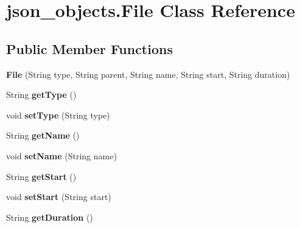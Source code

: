 \hypertarget{classjson__objects_1_1_file}{
\section{json\_\-objects.File Class Reference}
\label{classjson__objects_1_1_file}
}
\subsection*{Public Member Functions}
\begin{DoxyCompactItemize}
\item 
\hypertarget{classjson__objects_1_1_file_a3c3896088aa0d60ee4d27b61d6dbc1df}{
{\bfseries File} (String type, String parent, String name, String start, String duration)}
\label{classjson__objects_1_1_file_a3c3896088aa0d60ee4d27b61d6dbc1df}

\item 
\hypertarget{classjson__objects_1_1_file_a67dbfc9533416734c046255cf623bad7}{
String {\bfseries getType} ()}
\label{classjson__objects_1_1_file_a67dbfc9533416734c046255cf623bad7}

\item 
\hypertarget{classjson__objects_1_1_file_a7579b5773083d54cee785234b7fb85f0}{
void {\bfseries setType} (String type)}
\label{classjson__objects_1_1_file_a7579b5773083d54cee785234b7fb85f0}

\item 
\hypertarget{classjson__objects_1_1_file_a4b5a3a7c9a7f16eae3b5c43ee490e798}{
String {\bfseries getName} ()}
\label{classjson__objects_1_1_file_a4b5a3a7c9a7f16eae3b5c43ee490e798}

\item 
\hypertarget{classjson__objects_1_1_file_addda2136c7abc06e79e121bfe2f26d4c}{
void {\bfseries setName} (String name)}
\label{classjson__objects_1_1_file_addda2136c7abc06e79e121bfe2f26d4c}

\item 
\hypertarget{classjson__objects_1_1_file_a315cd1a5fc835c216e9f306ec255282e}{
String {\bfseries getStart} ()}
\label{classjson__objects_1_1_file_a315cd1a5fc835c216e9f306ec255282e}

\item 
\hypertarget{classjson__objects_1_1_file_a378afb8b015d2bebe4a3844b22d4d4e8}{
void {\bfseries setStart} (String start)}
\label{classjson__objects_1_1_file_a378afb8b015d2bebe4a3844b22d4d4e8}

\item 
\hypertarget{classjson__objects_1_1_file_adf69a08c56c3f78d85996d5de0ceb779}{
String {\bfseries getDuration} ()}
\label{classjson__objects_1_1_file_adf69a08c56c3f78d85996d5de0ceb779}


\end{DoxyCompactItemize}
